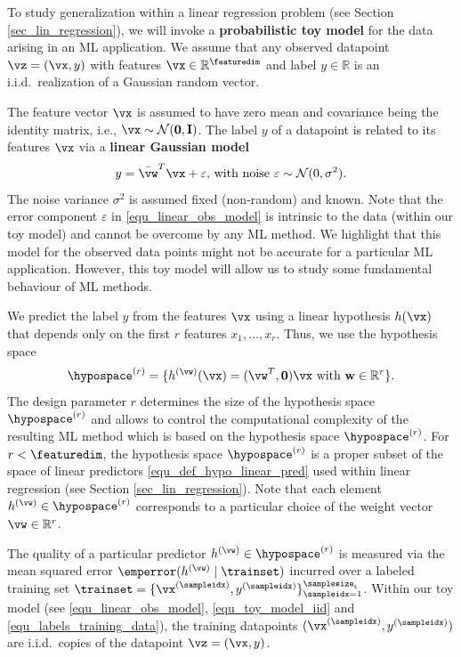 \documentclass[12pt]{report}
\begin{document}
To study generalization within a linear regression problem 
(see Section \ref{sec_lin_regression}), we will invoke a {\bf probabilistic toy model} 
for the data arising in an ML application. We assume that 
any observed datapoint $\vz=(\vx,y)$ with features $\vx \in \mathbb{R}^{\featuredim}$ 
and label $y \in \mathbb{R}$ is an i.i.d.\ realization of a 
Gaussian random vector. 

The feature vector $\vx$ is assumed to have zero mean and covariance 
being the identity matrix, i.e., $\vx \sim \mathcal{N}(\mathbf{0}, \mathbf{I})$. 
The label $y$ of a datapoint is related to its features $\vx$ via a 
{\bf linear Gaussian model} 
\begin{equation} 
\label{equ_linear_obs_model}
y = \bar{\vw}^{T}  \vx + \varepsilon \mbox{, with noise } \varepsilon \sim \mathcal{N}(0,\sigma^{2}).
\end{equation} 
The noise variance $\sigma^{2}$ is assumed fixed (non-random) and known. 
Note that the error component $\varepsilon$ in \eqref{equ_linear_obs_model} 
is intrinsic to the data (within our toy model) and cannot be overcome by 
any ML method. We highlight that this model for the observed data 
points might not be accurate for a particular ML application. However, 
this toy model will allow us to study some fundamental behaviour of ML methods. 

We predict the label $y$ from the features $\vx$ using a linear hypothesis $h(\vx)$ 
that depends only on the first $r$ features $x_{1},\ldots,x_{r}$. Thus, we use the 
hypothesis space 
\vspace*{-2mm}
\begin{equation}
\label{equ_generalization_hypospace_r}
\hypospace^{(r)} = \{ h^{(\vw)}(\vx)= (\vw^{T},\mathbf{0}) \vx \mbox{ with } \mathbf{w} \in \mathbb{R}^{r} \}.   
\vspace*{-1mm}
\end{equation}
The design parameter $r$ determines the size of the hypothesis space 
$\hypospace^{(r)}$ and allows to control the computational complexity 
of the resulting ML method which is based on the hypothesis space 
$\hypospace^{(r)}$. For $r < \featuredim$, the hypothesis space $\hypospace^{(r)}$ 
is a proper subset of the space of linear predictors \eqref{equ_def_hypo_linear_pred} 
used within linear regression (see Section \ref{sec_lin_regression}). Note that 
each element $h^{(\vw)} \in \hypospace^{(r)}$ corresponds to a particular 
choice of the weight vector $\vw \in \mathbb{R}^{r}$. 

The quality of a particular predictor $h^{(\vw)} \in \hypospace^{(r)}$ is measured 
via the mean squared error $\emperror (h^{(\vw)} \mid \trainset)$ incurred over a 
labeled training set $\trainset= \{ \vx^{(\sampleidx)}, y^{(\sampleidx)} \}_{\sampleidx=1}^{\samplesize_{\rm t}}$. 
Within our toy model (see \eqref{equ_linear_obs_model}, \eqref{equ_toy_model_iid} 
and \eqref{equ_labels_training_data}), the training datapoints $(\vx^{(\sampleidx)},y^{(\sampleidx)})$ 
are i.i.d.\ copies of the datapoint $\vz = (\vx,y)$. 
\end{document}
